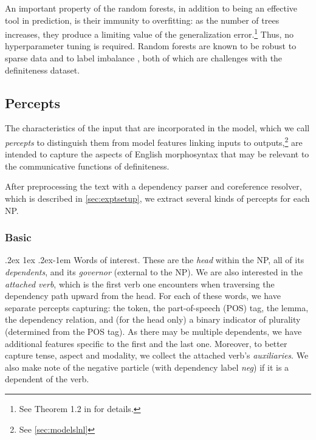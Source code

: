 \documentclass[11pt,letterpaper]{article}
\makeatletter
\renewcommand{\paragraph}{%
  \@startsection{paragraph}{4}%
  {\z@}{.2ex \@plus 1ex \@minus .2ex}{-1em}%
  {\normalfont\normalsize\bfseries}%
}
\makeatother
\begin{document}
An important property of the random forests, in addition to being an effective tool in prediction, is their immunity to overfitting: 
as the number of trees increases, they produce a limiting value of the generalization error.\footnote{See Theorem 1.2 in \cite{Breiman:2001} for details.} 
Thus, no hyperparameter tuning is required. %
Random forests are known to be robust to sparse data and to label imbalance \citep{chen}, both of which are challenges with the definiteness dataset.

\subsection{Percepts}\label{sec:feats}

The characteristics of the input that are incorporated in the model, which we call \emph{percepts} 
to distinguish them from model features linking inputs to outputs,\footnote{See \cref{sec:modelslnl}} 
are intended to capture the aspects of English morphosyntax that may be relevant 
to the communicative functions of definiteness.

After preprocessing the text with a dependency parser and coreference resolver, which is described in \cref{sec:exptsetup}, 
we extract several kinds of percepts for each NP.

\subsubsection{Basic}

\paragraph{Words of interest.} 
These are the \emph{head} within the NP, all of its \emph{dependents}, and its \emph{governor} (external to the NP). 
We are also interested in the \emph{attached verb}, which is the first verb one encounters when traversing the dependency path upward from the head. 
For each of these words, we have separate percepts capturing: the token, the part-of-speech (POS) tag, the lemma, 
the dependency relation,
and (for the head only) a binary indicator of plurality (determined from the POS tag).
As there may be multiple dependents, we have additional features specific to the first and the last one. 
Moreover, to better capture tense, aspect and modality, we collect the attached verb's \emph{auxiliaries}. 
We also make note of the negative particle (with dependency label \emph{neg}) if it is a dependent of the verb.
    
\end{document}
